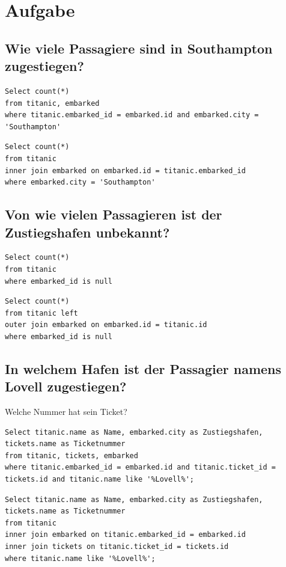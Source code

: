 \documentclass[a4paper, 11pt, titlepage]{article}
\begin{document}
\section{Aufgabe}
\subsection{Wie viele Passagiere sind in Southampton zugestiegen?}
\begin{lstlisting}[style = sql]
Select count(*)
from titanic, embarked
where titanic.embarked_id = embarked.id and embarked.city = 'Southampton'
\end{lstlisting}
\begin{lstlisting}[style = sql]
Select count(*)
from titanic 
inner join embarked on embarked.id = titanic.embarked_id
where embarked.city = 'Southampton'
\end{lstlisting}
\subsection{Von wie vielen Passagieren ist der Zustiegshafen unbekannt?}
\begin{lstlisting}[style = sql]
Select count(*)
from titanic
where embarked_id is null
\end{lstlisting}
\begin{lstlisting}[style = sql]
Select count(*)
from titanic left
outer join embarked on embarked.id = titanic.id
where embarked_id is null
\end{lstlisting}

\subsection{In welchem Hafen ist der Passagier namens Lovell zugestiegen?}
Welche Nummer hat sein Ticket?
\begin{lstlisting}[style = sql]
Select titanic.name as Name, embarked.city as Zustiegshafen, tickets.name as Ticketnummer
from titanic, tickets, embarked
where titanic.embarked_id = embarked.id and titanic.ticket_id = tickets.id and titanic.name like '%Lovell%';
\end{lstlisting}
\begin{lstlisting}[style = sql]
Select titanic.name as Name, embarked.city as Zustiegshafen, tickets.name as Ticketnummer
from titanic
inner join embarked on titanic.embarked_id = embarked.id
inner join tickets on titanic.ticket_id = tickets.id
where titanic.name like '%Lovell%';
\end{lstlisting}
\end{document}

